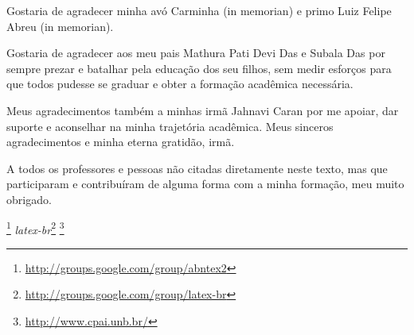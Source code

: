 \begin{agradecimentos}
	Gostaria de agradecer minha avó Carminha (in memorian) e primo Luiz Felipe Abreu (in memorian).

			Gostaria de agradecer aos meu pais Mathura Pati Devi Das e Subala Das por sempre prezar e batalhar pela educação dos seu filhos, sem medir esforços para que todos pudesse se graduar e obter a formação acadêmica necessária.

			Meus agradecimentos também a minhas irmã Jahnavi Caran por me apoiar, dar suporte e aconselhar na minha trajetória acadêmica. Meus sinceros agradecimentos e minha eterna gratidão, irmã.


			A todos os professores e pessoas não citadas diretamente neste texto, mas que participaram e contribuíram de alguma forma com a minha formação, meu muito obrigado.

	\emph{\abnTeX}\footnote{\url{http://groups.google.com/group/abntex2}}
	\emph{latex-br}\footnote{\url{http://groups.google.com/group/latex-br}} 
	\footnote{\url{http://www.cpai.unb.br/}}

\end{agradecimentos}
